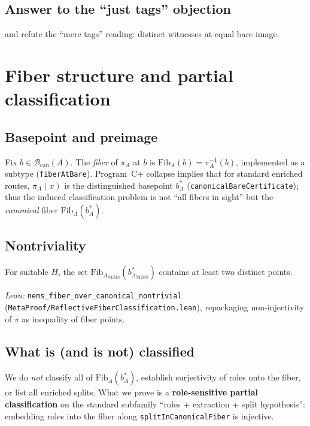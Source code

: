\documentclass[11pt]{article}
\begin{document}
\subsection{Answer to the ``just tags'' objection}\label{sec:strict-refinement-meaning}
 and  refute the ``mere tags'' reading: distinct witnesses at equal bare image.

\section{Fiber structure and partial classification}\label{sec:fiber-structure}

\subsection{Basepoint and preimage}\label{sec:fiber-structure-lang}
Fix $b \in \mathcal{B}_{\mathrm{can}}(A)$. The \emph{fiber} of $\pi_A$ at $b$ is $\mathrm{Fib}_A(b)=\pi_A^{-1}(b)$, implemented as a subtype (\texttt{fiberAtBare}). Program~C+ collapse implies that for standard enriched routes, $\pi_A(x)$ is the distinguished basepoint $b^\ast_A$ (\texttt{canonicalBareCertificate}); thus the induced classification problem is not ``all fibers in sight'' but the \emph{canonical} fiber $\mathrm{Fib}_A(b^\ast_A)$.

\subsection{Nontriviality}\label{sec:fiber-structure-nontrivial}
\begin{theorem}\label{thm:fiber-nontrivial}
For suitable $H$, the set $\mathrm{Fib}_{A_{\mathrm{NEMS}}}(b^\ast_{A_{\mathrm{NEMS}}})$ contains at least two distinct points.
\end{theorem}

\noindent\emph{Lean:} \texttt{nems\_fiber\_over\_canonical\_nontrivial} (\texttt{MetaProof/ReflectiveFiberClassification.lean}), repackaging non-injectivity of $\pi$ as inequality of fiber points.

\subsection{What is (and is not) classified}\label{sec:fiber-structure-classification}
We do \emph{not} classify all of $\mathrm{Fib}_A(b^\ast_A)$, establish surjectivity of roles onto the fiber, or list all enriched splits. What we prove is a \textbf{role-sensitive partial classification} on the standard subfamily ``roles + extraction + split hypothesis'': embedding roles into the fiber along \texttt{splitInCanonicalFiber} is injective.
\end{document}

